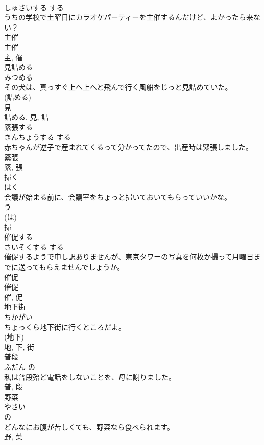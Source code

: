\documentclass[8pt]{extreport}
\begin{document}
\begin{CJK}{UTF8}{min}
\\	しゅさいする	する 
\\	うちの学校で土曜日にカラオケパーティーを主催するんだけど、よかったら来ない？	
\\	主催 
\\	主催 
\\	主, 催	
\\	見詰める	
\\	みつめる	
\\	その犬は、真っすぐ上へ上へと飛んで行く風船をじっと見詰めていた。	
\\	(詰める) 
\\	見 
\\	詰める.	見, 詰	
\\	緊張する	
\\	きんちょうする	する 
\\	赤ちゃんが逆子で産まれてくるって分かってたので、出産時は緊張しました。	
\\	緊張 
\\	緊, 張	
\\	掃く	
\\	はく	
\\	会議が始まる前に、会議室をちょっと掃いておいてもらっていいかな。	
\\	う 
\\	(は) 
\\	掃	
\\	催促する	
\\	さいそくする	する 
\\	催促するようで申し訳ありませんが、東京タワーの写真を何枚か撮って月曜日までに送ってもらえませんでしょうか。	
\\	催促 
\\	催促 
\\	催, 促	
\\	地下街	
\\	ちかがい	
\\	ちょっくら地下街に行くところだよ。	
\\	(地下) 
\\	地, 下, 街	
\\	普段	
\\	ふだん	の 
\\	私は普段殆ど電話をしないことを、母に謝りました。	
\\	普, 段	
\\	野菜	
\\	やさい	
\\	の 
\\	どんなにお腹が苦しくても、野菜なら食べられます。	
\\	野, 菜	

\end{CJK}
\end{document}
